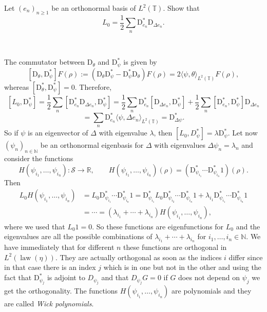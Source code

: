 \documentclass[a4paper,11pt]{article}
\newcommand{\assign}{:=}
\newcommand{\mathD}{\mathrm{D}}
\newcommand{\tmop}[1]{\ensuremath{\operatorname{#1}}}
\newcommand{\tmtextit}[1]{{\itshape{#1}}}
\newcommand{\CS}{\mathscr{S}}
\begin{document}
\begin{exercise}
  Let $(e_n)_{n \geqslant 1}$ be an orthonormal basis of $L^2 (\mathbb{T})$.
  Show that
  \[ L_0 = \frac{1}{2} \sum_n \mathD^{\ast}_{e_n} \mathD_{\Delta e_n} . \]
\end{exercise}

\

The commutator between $\mathD_{\theta}$ and $\mathD^{\ast}_{\psi}$ is given
by
\[ [\mathD_{\theta}, \mathD^{\ast}_{\psi}] F (\rho) \assign (\mathD_{\theta}
   \mathD^{\ast}_{\psi} - \mathD^{\ast}_{\psi} \mathD_{\theta}) F (\rho) = 2
   \langle \psi, \theta \rangle_{L^2 (\mathbb{T})} F (\rho), \]
whereas $[\mathD^{\ast}_{\theta}, \mathD^{\ast}_{\psi}] = 0$. Therefore,
\[ [L_0, \mathD^{\ast}_{\psi}] = \frac{1}{2} \sum_n [\mathD^{\ast}_{e_n}
   \mathD_{\Delta e_n}, \mathD^{\ast}_{\psi}] = \frac{1}{2} \sum_n
   \mathD^{\ast}_{e_n} [\mathD_{\Delta e_n}, \mathD^{\ast}_{\psi}] +
   \frac{1}{2} \sum_n [\mathD^{\ast}_{e_n}, \mathD^{\ast}_{\psi}]
   \mathD_{\Delta e_n} \]
\[ = \sum_n \mathD^{\ast}_{e_n} \langle \psi, \Delta e_n \rangle_{L^2
   (\mathbb{T})} = \mathD^{\ast}_{\Delta \psi} . \]
So if $\psi$ is an eigenvector of $\Delta$ with eigenvalue $\lambda$, then
$[L_0, D^{\ast}_{\psi}] = \lambda \mathD^{\ast}_{\psi}$. Let now $(\psi_n)_{n
\in \mathbb{N}}$ be an orthonormal eigenbasis for $\Delta$ with eigenvalues
$\Delta \psi_n = \lambda_n$ and consider the functions
\[ H (\psi_{i_1}, \ldots, \psi_{i_n}) : \CS \rightarrow \mathbb{R},
   \hspace{2em} H (\psi_{i_1}, \ldots, \psi_{i_n}) (\rho) = \left(
   \mathD^{\ast}_{\psi_{i_1}} \cdots \mathD^{\ast}_{\psi_{i_n}} 1 \right)
   (\rho) . \]
Then
\begin{align}\label{eq:L0-eigenvalues}
   L_0 H (\psi_{i_1}, \ldots, \psi_{i_n}) & = L_0 \mathD^{\ast}_{\psi_{i_1}} \cdots \mathD^{\ast}_{\psi_{i_n}} 1 =  \mathD^{\ast}_{\psi_{i_1}} L_0 \mathD^{\ast}_{\psi_{i_2}} \cdots \mathD^{\ast}_{\psi_{i_n}} 1 + \lambda_{i_1} \mathD^{\ast}_{\psi_{i_1}} \cdots \mathD^{\ast}_{\psi_{i_n}} 1 \\ \nonumber
  & = \cdots = (\lambda_{i_1} + \cdots + \lambda_{i_n}) H (\psi_{i_1}, \ldots,
   \psi_{i_n}),
\end{align}
where we used that $L_0 1 = 0$. So these functions are eigenfunctions for
$L_0$ and the eigenvalues are all the possible combinations of $\lambda_{i_1}
+ \cdots + \lambda_{i_n}$ for $i_1, \ldots, i_n \in \mathbb{N}$. We have
immediately that for different $n$ these functions are orthogonal in $L^2
(\tmop{law} (\eta))$. They are actually orthogonal as soon as the indices $i$
differ since in that case there is an index $j$ which is in one but not in the
other and using the fact that $\mathD^{\ast}_{\psi_j}$ is adjoint to
$D_{\psi_j}$ and that $D_{\psi_j} G = 0$ if $G$ does not depend on $\psi_j$ we
get the orthogonality. The functions $H (\psi_{i_1}, \ldots, \psi_{i_n})$ are
polynomials and they are called \tmtextit{Wick polynomials}.
\end{document}
